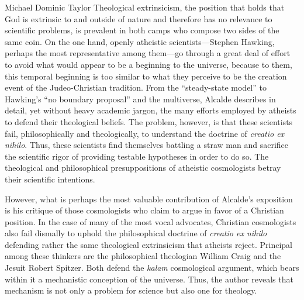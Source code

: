 \begin{recengenv}{Michael Dominic Taylor}
Theological extrinsicism, the position that holds that God is extrinsic to and outside of nature and therefore has no relevance to scientific problems, is prevalent in both camps who compose two sides of the same coin. On the one hand, openly atheistic scientists---Stephen Hawking, perhaps the most representative among them---go through a great deal of effort to avoid what would appear to be a beginning to the universe, because to them, this temporal beginning is too similar to what they perceive to be the creation event of the Judeo-Christian tradition. From the ``steady-state model'' to Hawking's ``no boundary proposal'' and the multiverse, Alcalde describes in detail, yet without heavy academic jargon, the many efforts employed by atheists to defend their theological beliefs. The problem, however, is that these scientists fail, philosophically and theologically, to understand the doctrine of \textit{creatio ex nihilo}. Thus, these scientists find themselves battling a straw man and sacrifice the scientific rigor of providing testable hypotheses in order to do so. The theological and philosophical presuppositions of atheistic cosmologists betray their scientific intentions.

However, what is perhaps the most valuable contribution of Alcalde's exposition is his critique of those cosmologists who claim to argue in favor of a Christian position. In the case of many of the most vocal advocates, Christian cosmologists also fail dismally to uphold the philosophical doctrine of \textit{creatio ex nihilo} defending rather the same theological extrinsicism that atheists reject. Principal among these thinkers are the philosophical theologian William Craig and the Jesuit Robert Spitzer.  Both defend the \textit{kalam} cosmological argument, which bears within it a mechanistic conception of the universe. Thus, the author reveals that mechanism is not only a problem for science but also one for theology.


\end{recengenv}

